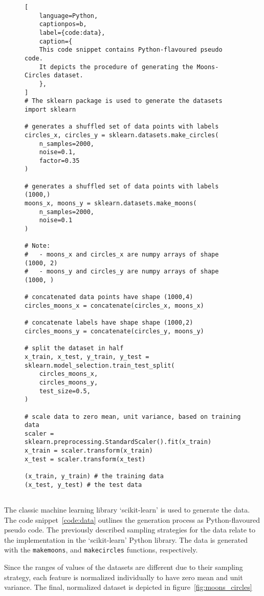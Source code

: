 \begin{figure}[ht]
\centering
\begin{minipage}{\linewidth}
\begin{lstlisting}[
    language=Python,
    captionpos=b, 
    label={code:data},
    caption={
    This code snippet contains Python-flavoured pseudo code.
    It depicts the procedure of generating the Moons-Circles dataset.
    },
]
# The sklearn package is used to generate the datasets
import sklearn 

# generates a shuffled set of data points with labels
circles_x, circles_y = sklearn.datasets.make_circles(
    n_samples=2000, 
    noise=0.1, 
    factor=0.35
)

# generates a shuffled set of data points with labels (1000,)
moons_x, moons_y = sklearn.datasets.make_moons(
    n_samples=2000, 
    noise=0.1
)

# Note: 
#   - moons_x and circles_x are numpy arrays of shape (1000, 2) 
#   - moons_y and circles_y are numpy arrays of shape (1000, ) 

# concatenated data points have shape (1000,4)
circles_moons_x = concatenate(circles_x, moons_x)

# concatenate labels have shape shape (1000,2)
circles_moons_y = concatenate(circles_y, moons_y)

# split the dataset in half
x_train, x_test, y_train, y_test = sklearn.model_selection.train_test_split(
    circles_moons_x, 
    circles_moons_y, 
    test_size=0.5, 
)

# scale data to zero mean, unit variance, based on training data
scaler = sklearn.preprocessing.StandardScaler().fit(x_train)
x_train = scaler.transform(x_train)
x_test = scaler.transform(x_test)

(x_train, y_train) # the training data
(x_test, y_test) # the test data


\end{lstlisting}
\end{minipage}
\end{figure}

The classic machine learning library `scikit-learn' is used to generate the data. 
The code snippet~\ref{code:data} outlines the generation process as Python-flavoured pseudo code.
The previously described sampling strategies for the data relate to the implementation in the `scikit-learn' Python library.
The data is generated with the \lstinline{makemoons}, and \lstinline{makecircles} functions, respectively.

Since the ranges of values of the datasets are different due to their sampling strategy, each feature is normalized individually to have zero mean and unit variance.
The final, normalized dataset is depicted in figure~\ref{fig:moons_circles}

